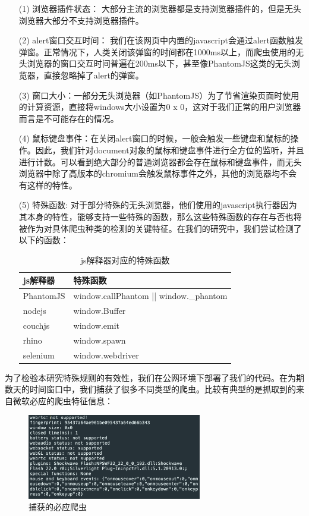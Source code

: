 \documentclass[doctor,privacy,twoside]{buaa_mac}
\begin{document}
\begin{itemize}
\item[(1)] 浏览器插件状态： 大部分主流的浏览器都是支持浏览器插件的，但是无头浏览器大部分不支持浏览器插件。
\item[(2)] alert窗口交互时间： 我们在该网页中内置的javascript会通过alert函数触发弹窗。正常情况下，人类关闭该弹窗的时间都在1000ms以上，而爬虫使用的无头浏览器的窗口交互时间普遍在200ms以下，甚至像PhantomJS这类的无头浏览器，直接忽略掉了alert的弹窗。
\item[(3)] 窗口大小：一部分无头浏览器（如PhantomJS）为了节省渲染页面时使用的计算资源，直接将windows大小设置为0 x 0，这对于我们正常的用户浏览器而言是不可能存在的情况。
\item[(4)] 鼠标键盘事件：在关闭alert窗口的时候，一般会触发一些键盘和鼠标的操作。因此，我们针对document对象的鼠标和键盘事件进行全方位的监听，并且进行计数。可以看到绝大部分的普通浏览器都会存在鼠标和键盘事件，而无头浏览器中除了高版本的chromium会触发鼠标事件之外，其他的浏览器均不会有这样的特性。
\item[(5)] 特殊函数: 对于部分特殊的无头浏览器，他们使用的javascript执行器因为其本身的特性，能够支持一些特殊的函数，那么这些特殊函数的存在与否也将被作为对具体爬虫种类的检测的关键特征。在我们的研究中，我们尝试检测了以下的函数：

\centerline{}
\begin{table}[h]
  \caption{js解释器对应的特殊函数}
  \label{tab:papercomponents}
  \centering
\begin{tabular}{|p{3cm}<{\centering}|p{8cm}<{\centering}|}
    \hline
   js解释器 &  特殊函数   \\
    \hline
PhantomJS &  window.callPhantom || window.\_{}phantom \\
\hline
nodejs & window.Buffer \\
\hline
couchjs & window.emit  \\
\hline
rhino & window.spawn \\
\hline
selenium & window.webdriver \\
\hline
    \end{tabular}
\end{table}
\centerline{}

\end{itemize}


为了检验本研究特殊规则的有效性，我们在公网环境下部署了我们的代码。在为期数天的时间窗口中，我们捕获了很多不同类型的爬虫。比较有典型的是抓取到的来自微软必应的爬虫特征信息：

\centerline{}
\begin{figure}[!h]
  \centering
  \includegraphics[width=0.68\textwidth]{images/bing_crawler.png}
  \caption{捕获的必应爬虫}
  \label{fig:logo}
\end{figure}
\centerline{}
\end{document}

